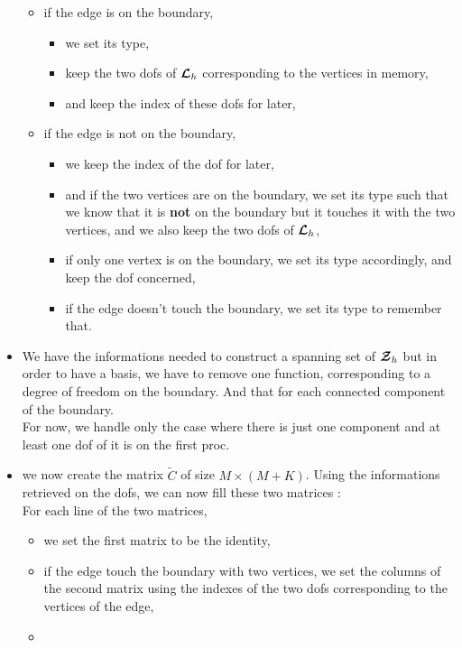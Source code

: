 \begin{itemize}
\begin{itemize}
  \item
    if the edge is on the boundary,
    \begin{itemize}
    \item
      we set its type,
    \item
      keep the two dofs of ${\bm{\mathcal{L}}}_h$ corresponding to the vertices in memory,
    \item
      and keep the index of these dofs for later,
    \end{itemize}
  \item
    if the edge is not on the boundary,
    \begin{itemize}
    \item
      we keep the index of the dof for later,
    \item
      and if the two vertices are on the boundary, we set its type such that we
      know that it is {\bf not} on the boundary but it touches it with the two
      vertices, and we also keep the two dofs of ${\bm{\mathcal{L}}}_h$,
    \item
      if only one vertex is on the boundary, we set its type accordingly, and
      keep the dof concerned,
    \item
      if the edge doesn't touch the boundary, we set its type to remember that.
    \end{itemize}
  \end{itemize}
\item
  We have the informations needed to construct a spanning set of ${\bm{\mathcal{Z}}}_h$ but in order to have a basis, we have to remove one function, corresponding to a degree of freedom on the boundary. And that for each connected component of the boundary.\\
  For now, we handle only the case where there is just one component and at least one dof of it is on the first proc. 
  
\item
  we now create the matrix $\tilde{C}$ of size $M\times (M+K)$. Using the informations retrieved on the dofs, we can now fill these two matrices :\\
  For each line of the two matrices,
  \begin{itemize}
  \item
    we set the first matrix to be the identity,
  \item
    if the edge touch the boundary with two vertices, we set the columns of
    the second matrix using the indexes of the two dofs corresponding to the
    vertices of the edge,
  \item

\end{itemize}
\end{itemize}

